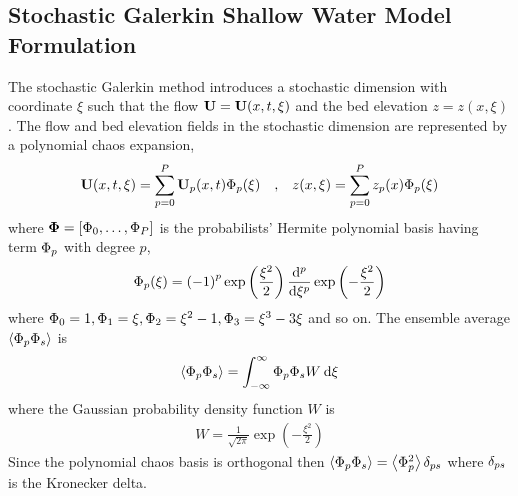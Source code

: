 \subsection{Stochastic Galerkin Shallow Water Model Formulation}
The stochastic Galerkin method introduces a stochastic dimension with coordinate $\xi$ such that the flow $\mathbf{U} = \mathbf{U}(x, t, \xi)$ and the bed elevation $z = z(x, \xi)$.
The flow and bed elevation fields in the stochastic dimension are represented by a polynomial chaos expansion,
\begin{align}
    \mathbf{U}(x, t, \xi) = \sum _{p=0}^P \mathbf{U}_p(x, t) \Phi_p(\xi) \quad\text{,}\quad
    z(x, \xi) = \sum _{p=0}^P z_p(x) \Phi_p(\xi)
\end{align}\label{eqn:pc-expansion}%
where $\bm{\Phi} = \left[ \Phi_0, \ldots, \Phi_P \right]$ is the probabilists' Hermite polynomial basis having term $\Phi_p$ with degree $p$,
\begin{align}
    \Phi_p(\xi) = \left( -1 \right)^p \exp \left(\frac{\xi^2}{2}\right)
    \frac{\mathrm{d}^p}{\mathrm{d} \xi^p} \exp \left(- \frac{\xi^2}{2} \right)
\end{align}
where $\Phi_0 = 1, \Phi_1 = \xi, \Phi_2 = \xi^2 - 1, \Phi_3 = \xi^3 - 3\xi$ and so on.
The ensemble average $\left\langle \Phi_p \Phi_s \right\rangle$ is 
\begin{align}
    \left\langle \Phi_p \Phi_s \right\rangle = \int_{-\infty}^\infty \Phi_p \Phi_s W \:\mathrm{d} \xi
\end{align}
where the Gaussian probability density function $W$ is
\begin{align}
    W = \frac{1}{\sqrt{2\pi}} \exp \left(-\frac{\xi^2}{2}\right)
\end{align}
Since the polynomial chaos basis is orthogonal then $\left\langle \Phi_p \Phi_s \right\rangle = \left\langle \Phi_p^2 \right\rangle \delta_{ps}$ where $\delta_{ps}$ is the Kronecker delta.

